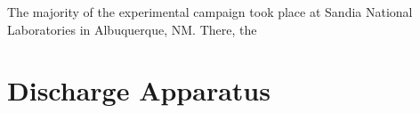The majority of the experimental campaign took place at Sandia National
Laboratories in Albuquerque, NM. There, the

\section{Discharge Apparatus}

